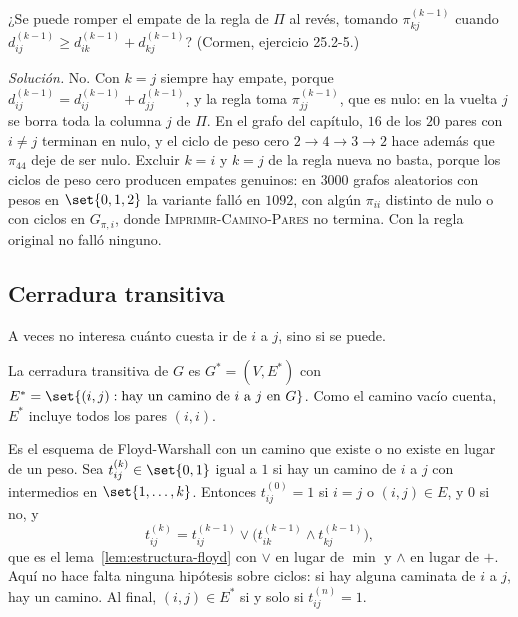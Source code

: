 \documentclass[11pt,letterpaper]{article}
\begin{document}
\begin{ejercicio}
  \label{ej:empates-floyd}
  ¿Se puede romper el empate de la regla de $\Pi$ al revés, tomando
  $\pi^{(k-1)}_{kj}$ cuando
  $d^{(k-1)}_{ij} \ge d^{(k-1)}_{ik} + d^{(k-1)}_{kj}$? (Cormen,
  ejercicio 25.2-5.)

  \emph{Solución.} No. Con $k = j$ siempre hay empate, porque
  $d^{(k-1)}_{ij} = d^{(k-1)}_{ij} + d^{(k-1)}_{jj}$, y la regla toma
  $\pi^{(k-1)}_{jj}$, que es nulo: en la vuelta $j$ se borra toda la
  columna $j$ de $\Pi$. En el grafo del capítulo, $16$ de los $20$
  pares con $i \neq j$ terminan en nulo, y el ciclo de peso cero
  $2 \to 4 \to 3 \to 2$ hace además que $\pi_{44}$ deje de ser nulo.
  Excluir $k = i$ y $k = j$ de la regla nueva no basta, porque los
  ciclos de peso cero producen empates genuinos: en $3000$ grafos
  aleatorios con pesos en $\set{0, 1, 2}$ la variante falló en
  $1092$, con algún $\pi_{ii}$ distinto de nulo o con ciclos en
  $G_{\pi,i}$, donde \textsc{Imprimir-Camino-Pares} no termina. Con la
  regla original no falló ninguno.
\end{ejercicio}


\subsection*{Cerradura transitiva}

A veces no interesa cuánto cuesta ir de $i$ a $j$, sino si se puede.

\begin{definicion}
  \label{def:cerradura-pares}
  La cerradura transitiva de $G$ es $G^* = (V, E^*)$ con
  $E^* = \set{(i, j) : \text{hay un camino de } i \text{ a } j
  \text{ en } G}$. Como el camino vacío cuenta, $E^*$ incluye todos
  los pares $(i, i)$.
\end{definicion}

Es el esquema de Floyd-Warshall con un camino que existe o no existe
en lugar de un peso. Sea $t^{(k)}_{ij} \in \set{0, 1}$ igual a $1$ si
hay un camino de $i$ a $j$ con intermedios en $\set{1, \dots, k}$.
Entonces $t^{(0)}_{ij} = 1$ si $i = j$ o $(i, j) \in E$, y $0$ si no, y
\[
  t^{(k)}_{ij} = t^{(k-1)}_{ij} \lor
                 \bigl( t^{(k-1)}_{ik} \land t^{(k-1)}_{kj} \bigr) ,
\]
que es el lema~\ref{lem:estructura-floyd} con $\lor$ en lugar de
$\min$ y $\land$ en lugar de $+$. Aquí no hace falta ninguna hipótesis
sobre ciclos: si hay alguna caminata de $i$ a $j$, hay un camino. Al
final, $(i, j) \in E^*$ si y solo si $t^{(n)}_{ij} = 1$.
\end{document}
